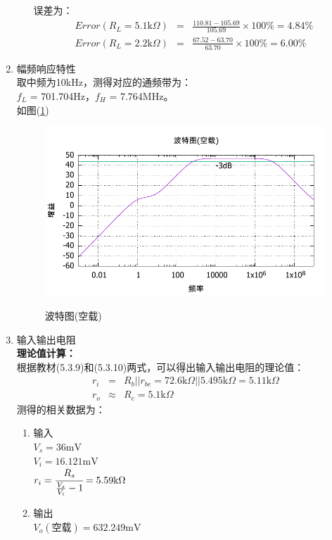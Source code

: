 \documentclass[a4paper]{article}
\begin{document}
\begin{enumerate}
\begin{enumerate}
误差为：
\begin{eqnarray}
Error(R_L = 5.1\text{k}\Omega) &=& \frac{110.81-105.69}{105.69}\times 100\% = 4.84\%\\
Error(R_L = 2.2\text{k}\Omega) &=& \frac{67.52-63.70}{63.70}\times 100\% = 6.00\%
\end{eqnarray}
\end{enumerate}
\item 幅频响应特性\\
取中频为10kHz，测得对应的通频带为：\\
$f_L$ = 701.704Hz，$f_H$ = 7.764MHz。\\
如图(\ref{bode})
\begin{figure}[!h]
\centering
\includegraphics[width=12cm]{fig/BodeNL.pdf}\\
\caption{波特图(空载)}\label{bode}
\end{figure}
\item 输入输出电阻\\
\textbf{理论值计算：}\\
根据教材(5.3.9)和(5.3.10)两式，可以得出输入输出电阻的理论值：
\begin{eqnarray}
r_i &=& R_b || r_{be} = 72.6\text{k}\Omega || 5.495\text{k}\Omega = 5.11\text{k}\Omega\\
r_o &\approx& R_c = 5.1\text{k}\Omega
\end{eqnarray}
测得的相关数据为：
\begin{enumerate}
\item 输入\\
$V_s = 36\text{mV}$\\
$V_i = 16.121\text{mV}$\\
$r_i = \cfrac{R_s}{\frac{V_s}{V_i}-1} = 5.59\text{k}\Omega$
\item 输出\\
$V_o(\text{空载}) = 632.249\text{mV}$\\

\end{enumerate}
\end{enumerate}
\end{document}
